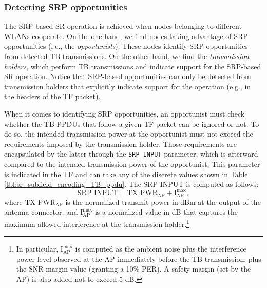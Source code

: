 \documentclass[comsoc]{IEEEtran}
\begin{document}
	\subsubsection{Detecting SRP opportunities}
	The SRP-based SR operation is achieved when nodes belonging to different WLANs cooperate. On the one hand, we find nodes taking advantage of SRP opportunities (i.e., the \emph{opportunists}). These nodes identify SRP opportunities from detected TB transmissions. On the other hand, we find the \emph{transmission holders}, which perform TB transmissions and indicate support for the SRP-based SR operation. Notice that SRP-based opportunities can only be detected from transmission holders that explicitly indicate support for the operation (e.g., in the headers of the TF packet).
	
	When it comes to identifying SRP opportunities, an opportunist must check whether the TB PPDUs that follow a given TF packet can be ignored or not. To do so, the intended transmission power at the opportunist must not exceed the requirements imposed by the transmission holder. Those requirements are encapsulated by the latter through the \texttt{SRP\_INPUT} parameter, which is afterward compared to the intended transmission power of the opportunist. This parameter is indicated in the TF and can take any of the discrete values shown in Table \ref{tbl:sr_subfield_encoding_TB_ppdu}. The SRP INPUT is computed as follows:
	\begin{equation}
	\text{SRP INPUT} = \text{TX PWR}_\text{AP} + \text{I}_\text{AP}^{\max},
	\label{eq:srp_input}
	\nonumber
	\end{equation}
	where $\text{TX PWR}_\text{AP}$ is the normalized transmit power in dBm at the output of the antenna connector, and $\text{I}_\text{AP}^{\max}$ is a normalized value in dB that captures the maximum allowed interference at the transmission holder.\footnote{In particular, $\text{I}_\text{AP}^{\max}$ is computed as the ambient noise plus the interference power level observed at the AP immediately before the TB transmission, plus the SNR margin value (granting a 10\% PER). A safety margin (set by the AP) is also added not to exceed 5 dB.}
	
\end{document}
